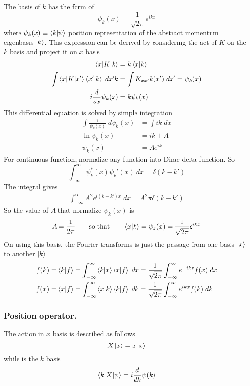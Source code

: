 \documentclass[../main.tex]{subfiles}
\begin{document}
The basis of $k$ has the form of 
\begin{equation*}
	\psi_k(x)=\frac{1 }{\sqrt{2\pi}}e^{ikx}
\end{equation*}
where $\psi_k(x)\equiv \braket{k|\psi}$ position representation of the abstract momentum eigenbasis $\ket{k}$.
This expression can be derived by considering the act of $K$ on the $k$ basis and project it on $x$ basis
\begin{align*}
	\braket{x|K|k}&=k\braket{x|k}\\
	\int \braket{x|K|x'}\braket{x'|k}\;dx'k &=\int K_{xx'}k(x')\;dx'=\psi_k(x)\\
	i\frac{d }{dx }\psi_k(x )&=k \psi_k(x)\\
\end{align*}
This differential equation is solved by simple integration
\begin{align*}
	\int \frac{1 }{\psi_k(x)}\;d\psi_k(x)&=\int ik\;dx\\
	\ln \psi_k(x)&=ik+A\\
	\psi_k(x)&=Ae^{ik}
\end{align*}
For continuous function, normalize any function into Dirac delta function.
So
\begin{equation*}
	\int_{-\infty}^{\infty} \psi_k ^*(x) \psi_k' (x)\;dx=\delta(k-k')
\end{equation*}
The integral gives 
\begin{align*}
	\int_{-\infty}^{\infty} A^2e^{i(k-k')x}\;dx=A^2\pi \delta(k-k')
\end{align*}
So the value of $A$ that normalize $\psi_k(x)$ is 
\begin{equation*}
	A=\frac{1 }{2\pi}\qquad\text{so that}\qquad \braket{x|k}=\psi_k(x)=\frac{1 }{\sqrt{2\pi}}e^{ikx}
\end{equation*}
On using this basis, the Fourier transforms is just the passage from one basis $\ket{x}$ to another $\ket{k}$
\begin{align*}
	f(k)&=\braket{k|f}=\int_{-\infty}^{\infty} \braket{k|x}\braket{x|f}\;dx=\frac{1 }{\sqrt{2\pi}}\int_{-\infty}^{\infty} e^{-ikx} f(x)\;dx\\
	f(x)&=\braket{x|f}=\int_{-\infty}^{\infty} \braket{x|k}\braket{k|f}\;dk=\frac{1 }{\sqrt{2\pi}}\int_{-\infty}^{\infty} e^{ikx} f(k)\;dk\\
\end{align*}

\subsubsection*{Position operator.}
The action in $x$ basis is described as follows
\begin{equation*}
	X \ket{x}=x \ket{x}
\end{equation*}
while is the $k$ basis
\begin{equation*}
	\braket{k|X|\psi}=i \frac{d }{dk}\psi(k)
\end{equation*}
\end{document}
